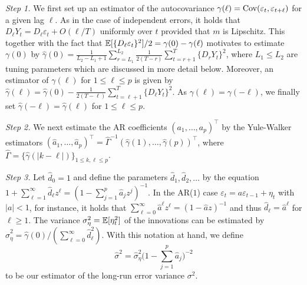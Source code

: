 \textit{Step 1.} We first set up an estimator of the autocovariance $\gamma(\ell) = \textnormal{Cov}(\varepsilon_t,\varepsilon_{t+\ell})$ for a given lag $\ell$. As in the case of independent errors, it holds that $D_\ell Y_t = D_\ell \varepsilon_t + O(\ell/T)$ uniformly over $t$ provided that $m$ is Lipschitz. This together with the fact that $\mathbb{E}[ \{  D_\ell \varepsilon_t \}^2 ] / 2 = \gamma(0) - \gamma(\ell)$ motivates to estimate $\gamma(0)$ by
$\widehat{\gamma}(0) = \frac{1}{L_2-L_1+1}\sum_{r=L_1}^{L_2}\frac{1}{2(T-r)}\sum_{t=r+1}^T\{D_rY_t\}^2$, 
where $L_1\le L_2$ are tuning parameters which are discussed in more detail below. Moreover, an estimator of $\gamma(\ell)$ for $1 \le \ell \le p$ is given by 
$\widehat{\gamma}(\ell) = \widehat{\gamma}(0) - \frac{1}{2(T-\ell)}\sum_{t=\ell+1}^T \{D_\ell Y_t\}^2$.
As $\gamma(\ell) = \gamma(-\ell)$, we finally set $\widehat{\gamma}(-\ell) = \widehat{\gamma}(\ell)$ for $1 \le \ell \le p$. 
\vspace{10pt}

\textit{Step 2.} We next estimate the AR coefficients $(a_1,\ldots,a_p)^\top$ by the Yule-Walker estimators $(\widehat{a}_1,\ldots,\widehat{a}_p)^\top = \widehat{\Gamma}^{-1} (\widehat{\gamma}(1), \ldots, \widehat{\gamma}(p))^\top$, where $\widehat{\Gamma} = \{ \widehat{\gamma}(|k-\ell|) \}_{1 \le k,\ell \le p}$. 
\vspace{10pt}

\textit{Step 3.} Let $\widehat{d}_0 = 1$ and define the parameters $\widehat{d}_1, \widehat{d}_2, \ldots$ by the equation $1 + \sum_{\ell=1}^\infty \widehat{d}_\ell z^\ell = (1 - \sum_{j=1}^p \widehat{a}_j z^j )^{-1}$. In the AR($1$) case $\varepsilon_t = a \varepsilon_{t-1} + \eta_t$ with $|a| < 1$, for instance, it holds that $\sum_{\ell = 0}^\infty \widehat{a}^\ell z^\ell = (1 - \widehat{a}z)^{-1}$ and thus $\widehat{d}_\ell = \widehat{a}^\ell$ for $\ell \ge 1$. The variance $\sigma_\eta^2 = \mathbb{E}[\eta_t^2]$ of the innovations can be estimated by $\widehat{\sigma}_\eta^2 = \widehat{\gamma}(0) / (\sum_{\ell=0}^\infty \widehat{d}_\ell^2)$. With this notation at hand, we define 
\[\widehat{\sigma}^2 = \widehat{\sigma}^2_\eta \Big( 1-\sum_{j=1}^p \widehat{a}_j\Big)^{-2} \]
to be our estimator of the long-run error variance $\sigma^2$.
\vspace{10pt}



